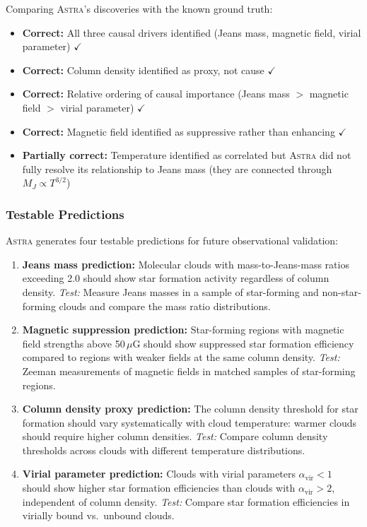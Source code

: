 \documentclass[fleqn,usenatbib]{mnras}
\newcommand{\astra}{\textsc{Astra}\xspace}
\begin{document}
Comparing \astra's discoveries with the known ground truth:
\begin{itemize}
  \item \textbf{Correct:} All three causal drivers identified (Jeans mass, magnetic field, virial parameter) $\checkmark$
  \item \textbf{Correct:} Column density identified as proxy, not cause $\checkmark$
  \item \textbf{Correct:} Relative ordering of causal importance (Jeans mass $>$ magnetic field $>$ virial parameter) $\checkmark$
  \item \textbf{Correct:} Magnetic field identified as suppressive rather than enhancing $\checkmark$
  \item \textbf{Partially correct:} Temperature identified as correlated but \astra did not fully resolve its relationship to Jeans mass (they are connected through $M_J \propto T^{3/2}$)
\end{itemize}

\subsubsection{Testable Predictions}
\label{sec:tc6:phase6}

\astra generates four testable predictions for future observational validation:
\begin{enumerate}
  \item[(P1)] \textbf{Jeans mass prediction:} Molecular clouds with mass-to-Jeans-mass ratios exceeding 2.0 should show star formation activity regardless of column density. \emph{Test:} Measure Jeans masses in a sample of star-forming and non-star-forming clouds and compare the mass ratio distributions.

  \item[(P2)] \textbf{Magnetic suppression prediction:} Star-forming regions with magnetic field strengths above 50\,$\mu$G should show suppressed star formation efficiency compared to regions with weaker fields at the same column density. \emph{Test:} Zeeman measurements of magnetic fields in matched samples of star-forming regions.

  \item[(P3)] \textbf{Column density proxy prediction:} The column density threshold for star formation should vary systematically with cloud temperature: warmer clouds should require higher column densities. \emph{Test:} Compare column density thresholds across clouds with different temperature distributions.

  \item[(P4)] \textbf{Virial parameter prediction:} Clouds with virial parameters $\alpha_\mathrm{vir} < 1$ should show higher star formation efficiencies than clouds with $\alpha_\mathrm{vir} > 2$, independent of column density. \emph{Test:} Compare star formation efficiencies in virially bound vs.\ unbound clouds.
\end{enumerate}
\end{document}

